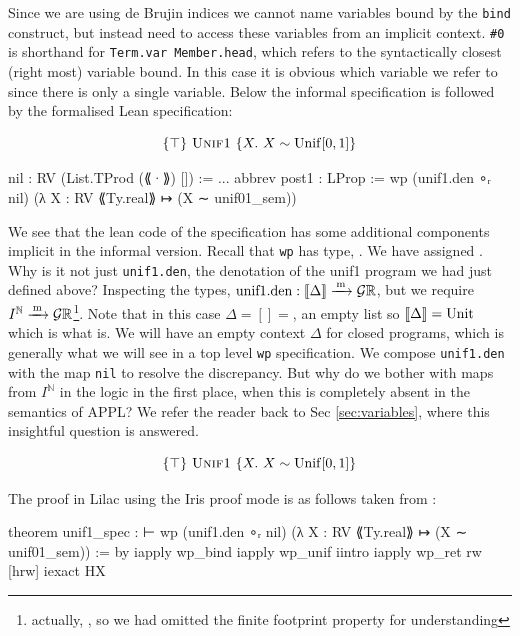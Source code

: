 Since we are using de Brujin indices we cannot name variables bound by the \texttt{bind} construct, but instead need to access these variables
from an implicit context. \texttt{\#0} is shorthand for \texttt{Term.var Member.head}, which refers to the syntactically closest (right most)
variable bound. In this case it is obvious which variable we refer to since there is only a single variable. Below the informal
specification is followed by the formalised Lean specification:

\[
\{ \top \}\ \textsc{Unif1}\ \{ X.\ X \sim \mathrm{Unif}[0,1] \}
\]

\begin{leancode}
nil : RV (List.TProd (⟪·⟫) []) := ...
abbrev post1 : LProp :=
  wp (unif1.den ∘ᵣ nil) (λ X : RV ⟪Ty.real⟫ ↦ (X ∼ unif01_sem))
\end{leancode}

We see that the lean code of the specification has some additional components implicit in the informal version.  Recall that \texttt{wp} has type, .
We have assigned . Why is it not just \texttt{unif1.den}, the denotation of the unif1 program we had just defined above?
Inspecting the types, $\text{unif1.den} : \llbracket \Delta \rrbracket \xrightarrow{\,\mathrm{m}\,} \mathcal{G} \mathbb{R}$, but we require $I^\mathbb{N} \xrightarrow{\,\mathrm{m}\,} \mathcal{G} \mathbb{R}$\footnote{actually, , so we had omitted the finite
footprint property for understanding}. Note that in this case $\Delta = [] = $, an empty list so $\llbracket \Delta \rrbracket = \text{Unit}$ which is what  is. We will have an empty context $\Delta$ for closed programs, which is
generally what we will see in a top level \texttt{wp} specification.
We compose \texttt{unif1.den} with the map \texttt{nil} to resolve the discrepancy.
But why do we bother with maps from $I^\mathbb{N}$ in the logic in the first place, when this is completely absent in the semantics of APPL? We refer the reader back to Sec \ref{sec:variables}, where this insightful question is answered.

\[
\{ \top \}\ \textsc{Unif1}\ \{ X.\ X \sim \mathrm{Unif}[0,1] \}
\]

The proof in Lilac using the Iris proof mode is as follows taken from :

\begin{leancode}

theorem unif1_spec :
    ⊢ wp (unif1.den ∘ᵣ nil) (λ X : RV ⟪Ty.real⟫ ↦ (X ∼ unif01_sem)) := by
  iapply wp_bind
  iapply wp_unif
  iintro %
  iapply wp_ret
  rw [hrw]
  iexact HX

\end{leancode}

